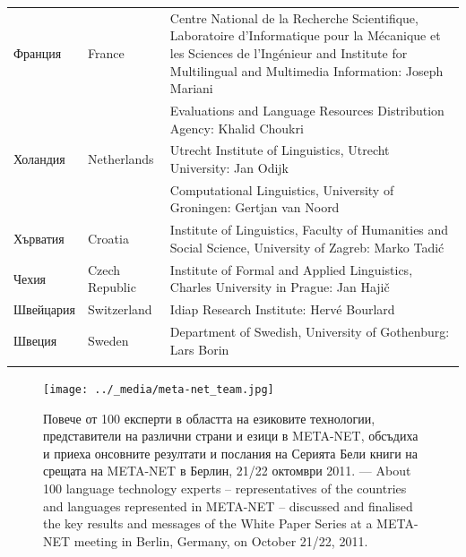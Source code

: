 \begin{longtable}{@{}llp{110mm}@{}}
    Франция & \textcolor{grey1}{France} & Centre National de la Recherche Scientifique, Laboratoire d'Informatique pour la Mécanique et les Sciences de l'Ingénieur and Institute for Multilingual and Multimedia Information: Joseph Mariani \\ \addlinespace
    & & Evaluations and Language Resources Distribution Agency: Khalid Choukri\\ \addlinespace 
    Холандия & \textcolor{grey1}{Netherlands} & Utrecht Institute of Linguistics, Utrecht University: Jan Odijk\\ \addlinespace 
    & & Computational Linguistics, University of Groningen: Gertjan van
    Noord\\ \addlinespace
    Хърватия & \textcolor{grey1}{Croatia} & Institute of Linguistics,
    Faculty of Humanities and Social Science, University of Zagreb:
    Marko Tadić \\ \addlinespace
    Чехия & \textcolor{grey1}{Czech Republic} & Institute of Formal and Applied Linguistics, Charles University in Prague: Jan Hajič \\ \addlinespace
    Швейцария & \textcolor{grey1}{Switzerland} & Idiap Research
    Institute: Hervé Bourlard \\ \addlinespace 
    Швеция & \textcolor{grey1}{Sweden} & Department of Swedish, University of Gothenburg: Lars Borin \\ \addlinespace 
  \end{longtable}
  \normalsize

  \renewcommand*{\figureformat}{}
  \renewcommand*{\captionformat}{}

  \begin{figure}[htb]
    \center
  \texttt{[image: ../\_media/meta-net\_team.jpg]}
  \caption{Повече от 100 експерти в областта на езиковите технологии, представители на различни страни и езици в META-NET, обсъдиха и приеха онсовните резултати и послания на Серията Бели книги на срещата на  META-NET в Берлин, 21/22 октомври 2011. --- \textcolor{grey1}{About 100 language technology experts -- representatives of the countries and languages represented in META-NET -- discussed and finalised the key results and messages of the White Paper Series at a META-NET meeting in Berlin, Germany, on October 21/22, 2011.}}
    \medskip
  \end{figure}

